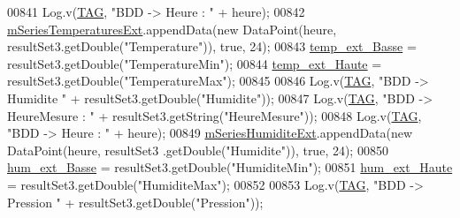 \begin{DoxyCode}
00841                             Log.v(\hyperlink{classfr_1_1campus_1_1laurainc_1_1honeybee_1_1_ruche_a44739cbb0fa7451c1edc240a3f51c257}{TAG}, \textcolor{stringliteral}{"BDD -> Heure : "} + heure);
00842                             \hyperlink{classfr_1_1campus_1_1laurainc_1_1honeybee_1_1_ruche_a67713d2f8d0adba8ac6ef782001e23a1}{mSeriesTemperaturesExt}.appendData(\textcolor{keyword}{new} DataPoint(heure, 
      resultSet3.getDouble(\textcolor{stringliteral}{"Temperature"})), \textcolor{keyword}{true}, 24);
00843                             \hyperlink{classfr_1_1campus_1_1laurainc_1_1honeybee_1_1_ruche_ad7171f31281b9e806b7622473bf5d8f1}{temp\_ext\_Basse} = resultSet3.getDouble(\textcolor{stringliteral}{"TemperatureMin"});
00844                             \hyperlink{classfr_1_1campus_1_1laurainc_1_1honeybee_1_1_ruche_aa5737d305533c90c63a57fb567ed7eb4}{temp\_ext\_Haute} = resultSet3.getDouble(\textcolor{stringliteral}{"TemperatureMax"});
00845 
00846                             Log.v(\hyperlink{classfr_1_1campus_1_1laurainc_1_1honeybee_1_1_ruche_a44739cbb0fa7451c1edc240a3f51c257}{TAG}, \textcolor{stringliteral}{"BDD -> Humidite "} + resultSet3.getDouble(\textcolor{stringliteral}{"Humidite"}));
00847                             Log.v(\hyperlink{classfr_1_1campus_1_1laurainc_1_1honeybee_1_1_ruche_a44739cbb0fa7451c1edc240a3f51c257}{TAG}, \textcolor{stringliteral}{"BDD -> HeureMesure : "} + resultSet3.getString(\textcolor{stringliteral}{"HeureMesure"}));
00848                             Log.v(\hyperlink{classfr_1_1campus_1_1laurainc_1_1honeybee_1_1_ruche_a44739cbb0fa7451c1edc240a3f51c257}{TAG}, \textcolor{stringliteral}{"BDD -> Heure : "} + heure);
00849                             \hyperlink{classfr_1_1campus_1_1laurainc_1_1honeybee_1_1_ruche_abe6075db6a4cd92a43a0972514b4b552}{mSeriesHumiditeExt}.appendData(\textcolor{keyword}{new} DataPoint(heure, resultSet3
      .getDouble(\textcolor{stringliteral}{"Humidite"})), \textcolor{keyword}{true}, 24);
00850                             \hyperlink{classfr_1_1campus_1_1laurainc_1_1honeybee_1_1_ruche_a6aea5ac6dffbcfdfb0a8596c177de0f6}{hum\_ext\_Basse} = resultSet3.getDouble(\textcolor{stringliteral}{"HumiditeMin"});
00851                             \hyperlink{classfr_1_1campus_1_1laurainc_1_1honeybee_1_1_ruche_a4704dea77345a189a860088023a56726}{hum\_ext\_Haute} = resultSet3.getDouble(\textcolor{stringliteral}{"HumiditeMax"});
00852 
00853                             Log.v(\hyperlink{classfr_1_1campus_1_1laurainc_1_1honeybee_1_1_ruche_a44739cbb0fa7451c1edc240a3f51c257}{TAG}, \textcolor{stringliteral}{"BDD -> Pression "} + resultSet3.getDouble(\textcolor{stringliteral}{"Pression"}));

\end{DoxyCode}
